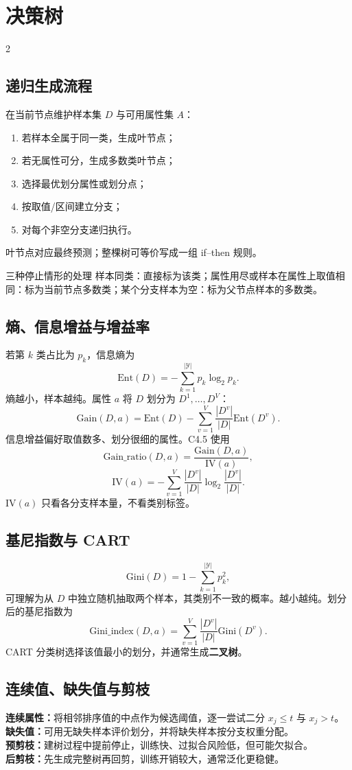 \documentclass[9pt,a4paper,UTF8]{ctexart}
\begin{document}
\section{决策树}
\begin{multicols}{2}
\subsection{递归生成流程}
在当前节点维护样本集 $D$ 与可用属性集 $A$：
\begin{enumerate}
\item 若样本全属于同一类，生成叶节点；
\item 若无属性可分，生成多数类叶节点；
\item 选择最优划分属性或划分点；
\item 按取值/区间建立分支；
\item 对每个非空分支递归执行。
\end{enumerate}
叶节点对应最终预测；整棵树可等价写成一组 if--then 规则。

\begin{warnbox}{三种停止情形的处理}
样本同类：直接标为该类；属性用尽或样本在属性上取值相同：标为当前节点多数类；某个分支样本为空：标为父节点样本的多数类。
\end{warnbox}

\subsection{熵、信息增益与增益率}
若第 $k$ 类占比为 $p_k$，信息熵为
\[
\mathrm{Ent}(D)=-\sum_{k=1}^{|\mathcal Y|}p_k\log_2p_k.
\]
熵越小，样本越纯。属性 $a$ 将 $D$ 划分为 $D^1,\ldots,D^V$：
\[
\mathrm{Gain}(D,a)=\mathrm{Ent}(D)-\sum_{v=1}^{V}\frac{|D^v|}{|D|}\mathrm{Ent}(D^v).
\]
信息增益偏好取值数多、划分很细的属性。C4.5 使用
\[
\mathrm{Gain\_ratio}(D,a)=\frac{\mathrm{Gain}(D,a)}{\mathrm{IV}(a)},
\]
\[
\mathrm{IV}(a)=-\sum_{v=1}^{V}\frac{|D^v|}{|D|}\log_2\frac{|D^v|}{|D|}.
\]
$\mathrm{IV}(a)$ 只看各分支样本量，不看类别标签。

\subsection{基尼指数与 CART}
\[
\mathrm{Gini}(D)=1-\sum_{k=1}^{|\mathcal Y|}p_k^2,
\]
可理解为从 $D$ 中独立随机抽取两个样本，其类别不一致的概率。越小越纯。划分后的基尼指数为
\[
\mathrm{Gini\_index}(D,a)=\sum_{v=1}^{V}\frac{|D^v|}{|D|}\mathrm{Gini}(D^v).
\]
CART 分类树选择该值最小的划分，并通常生成\textbf{二叉树}。

\subsection{连续值、缺失值与剪枝}
\textbf{连续属性：}将相邻排序值的中点作为候选阈值，逐一尝试二分 $x_j\le t$ 与 $x_j>t$。\\
\textbf{缺失值：}可用无缺失样本评价划分，并将缺失样本按分支权重分配。\\
\textbf{预剪枝：}建树过程中提前停止，训练快、过拟合风险低，但可能欠拟合。\\
\textbf{后剪枝：}先生成完整树再回剪，训练开销较大，通常泛化更稳健。


\end{multicols}
\end{document}
